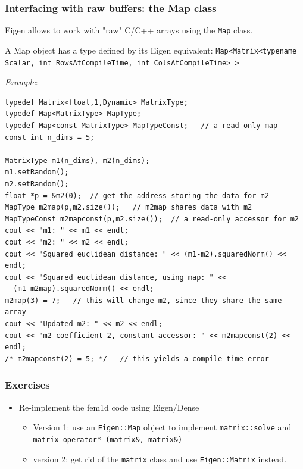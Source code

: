 \documentclass[smaller,a4paper]{beamer}
\newcommand{\cpp}[1]{\lstinline!#1!}
\begin{document}
\begin{frame}
\frametitle{Interfacing with raw buffers: the Map class}
Eigen allows to work with "raw" C/C++ arrays using the
 \cpp{Map} class.

A Map object has a type defined by its Eigen equivalent:
\cpp{Map<Matrix<typename Scalar, int RowsAtCompileTime, int ColsAtCompileTime> >}

\null

\emph{Example}:
\begin{lstlisting}
typedef Matrix<float,1,Dynamic> MatrixType;
typedef Map<MatrixType> MapType;
typedef Map<const MatrixType> MapTypeConst;   // a read-only map
const int n_dims = 5;
  
MatrixType m1(n_dims), m2(n_dims);
m1.setRandom();
m2.setRandom();
float *p = &m2(0);  // get the address storing the data for m2
MapType m2map(p,m2.size());   // m2map shares data with m2
MapTypeConst m2mapconst(p,m2.size());  // a read-only accessor for m2
cout << "m1: " << m1 << endl;
cout << "m2: " << m2 << endl;
cout << "Squared euclidean distance: " << (m1-m2).squaredNorm() << endl;
cout << "Squared euclidean distance, using map: " <<
  (m1-m2map).squaredNorm() << endl;
m2map(3) = 7;   // this will change m2, since they share the same array
cout << "Updated m2: " << m2 << endl;
cout << "m2 coefficient 2, constant accessor: " << m2mapconst(2) << endl;
/* m2mapconst(2) = 5; */   // this yields a compile-time error
\end{lstlisting}

\end{frame}

\begin{frame}\frametitle{Exercises}
\begin{itemize}
\item Re-implement the fem1d code using Eigen/Dense\\[5mm]
\begin{itemize}
\item Version 1: use an \cpp{Eigen::Map} object to implement 
\cpp{matrix::solve} and \cpp{matrix operator* (matrix&, matrix&)}\\[5mm]
\item version 2: get rid of the \cpp{matrix} class and use \cpp{Eigen::Matrix} instead.
\end{itemize}
\end{itemize}
\end{frame}
\end{document}
